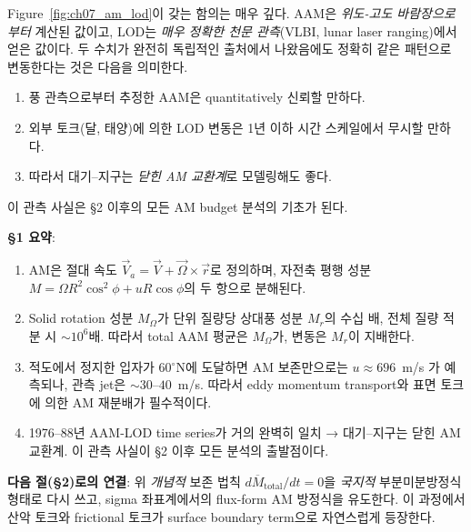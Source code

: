 \begin{remark}
Figure~\ref{fig:ch07_am_lod}이 갖는 함의는 매우 깊다.  AAM은 \emph{위도-고도
바람장으로부터} 계산된 값이고, LOD는 \emph{매우 정확한 천문 관측}(VLBI, lunar
laser ranging)에서 얻은 값이다.  두 수치가 완전히 독립적인 출처에서 나왔음에도
정확히 같은 패턴으로 변동한다는 것은 다음을 의미한다.
\begin{enumerate}
  \item 풍 관측으로부터 추정한 AAM은 quantitatively 신뢰할 만하다.
  \item 외부 토크(달, 태양)에 의한 LOD 변동은 1년 이하 시간 스케일에서 무시할 만하다.
  \item 따라서 대기--지구는 \emph{닫힌 AM 교환계}로 모델링해도 좋다.
\end{enumerate}
이 관측 사실은 \S2 이후의 모든 AM budget 분석의 기초가 된다.
\end{remark}


\begin{hisublock}
\textbf{\S1 요약}:
\begin{enumerate}
  \item AM은 절대 속도 $\vec{V}_a = \vec{V} + \vec{\Omega}\times\vec{r}$로 정의하며,
        자전축 평행 성분 $M = \Omega R^2 \cos^2\phi + uR\cos\phi$의 두 항으로
        분해된다.
  \item Solid rotation 성분 $M_\Omega$가 단위 질량당 상대풍 성분 $M_r$의 수십 배,
        전체 질량 적분 시 $\sim 10^6$배.  따라서 total AAM 평균은 $M_\Omega$가,
        변동은 $M_r$이 지배한다.
  \item 적도에서 정지한 입자가 60$^\circ$N에 도달하면 AM 보존만으로는 $u\approx 696$~m/s
        가 예측되나, 관측 jet은 $\sim 30$--$40$~m/s.  따라서 eddy momentum transport와
        표면 토크에 의한 AM 재분배가 필수적이다.
  \item 1976--88년 AAM-LOD time series가 거의 완벽히 일치 → 대기--지구는 닫힌
        AM 교환계.  이 관측 사실이 \S2 이후 모든 분석의 출발점이다.
\end{enumerate}

\medskip
\textbf{다음 절(\S2)로의 연결}: 위 \emph{개념적} 보존 법칙
$d\overline{M}_{\text{total}}/dt = 0$을 \emph{국지적} 부분미분방정식 형태로
다시 쓰고, sigma 좌표계에서의 flux-form AM 방정식을 유도한다.  이 과정에서
산악 토크와 frictional 토크가 surface boundary term으로 자연스럽게 등장한다.
\end{hisublock}

